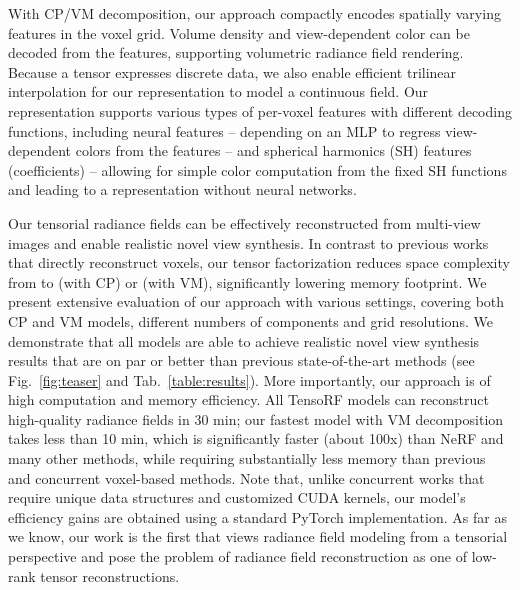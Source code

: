 \documentclass[runningheads]{llncs}
\begin{document}
With CP/VM decomposition, our approach compactly encodes spatially varying features in the voxel grid. Volume density and view-dependent color can be decoded from the features, supporting volumetric radiance field rendering. Because a tensor expresses discrete data, we also enable efficient trilinear interpolation for our representation to model a continuous field.
Our representation supports various types of per-voxel features with different decoding functions, including neural features -- depending on an MLP to regress view-dependent colors from the features -- and spherical harmonics (SH) features (coefficients) -- allowing for simple color computation from the fixed SH functions and leading to a representation without neural networks.

Our tensorial radiance fields can be effectively reconstructed from multi-view images and enable realistic novel view synthesis.
In contrast to previous works that directly reconstruct voxels, our tensor factorization reduces space complexity from  to  (with CP) or  (with VM), significantly lowering memory footprint. 
We present extensive evaluation of our approach with various settings, covering both CP and VM models, different numbers of components and grid resolutions. 
We demonstrate that all models are able to achieve realistic novel view synthesis results that are on par or better than previous state-of-the-art methods (see Fig.~\ref{fig:teaser} and Tab.~\ref{table:results}).
More importantly, our approach is of high computation and memory efficiency.
All TensoRF models can reconstruct high-quality radiance fields in 30 min; our fastest model with VM decomposition takes less than 10 min, which is significantly faster (about 100x) than NeRF and many other methods, while requiring substantially less memory than previous and concurrent voxel-based methods.
Note that, unlike concurrent works \cite{yu2021plenoxels,muller2022instant} that require unique data structures and customized CUDA kernels, our model's efficiency gains are obtained using a standard PyTorch implementation. 
As far as we know, our work is the first that views radiance field modeling from a tensorial perspective and pose the problem of radiance field reconstruction as one of low-rank tensor reconstructions. 
\end{document}
